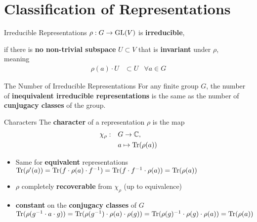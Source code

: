 
\section{Classification of Representations}

\begin{frame}{Irreducible Representations}
    \large
    $\rho: G \to \operatorname{GL}(V)$ is \textbf{irreducible},
    
    \pause
    if there is \textbf{no non-trivial subspace} $U \subset V$ that is \textbf{invariant} under $\rho$, \\
    meaning
    \begin{align*}
        \rho(a) \cdot U & \subset U & \forall a \in G
    \end{align*}

    \normalsize
    {\hspace*{\fill} \cite{hein2013}}

\end{frame}

\begin{frame}{The Number of Irreducible Representations}
    \large
    For any finite group $G$, the number of \textbf{inequivalent irreducible representations} is the same as the number of \textbf{cunjugacy classes} of the group.

    {\hspace*{\fill} \cite{fulton2013}}
    
\end{frame}

\begin{frame}{Characters}
    \large
    The \textbf{character} of a representation $\rho$ is the map
    \Large
    \begin{align*}
        \chi_\rho: \quad & G \to \mathbb{C}, \\
        & a \mapsto \operatorname{Tr}(\rho(a))
    \end{align*}
    
    \pause
    \large
    \begin{itemize}
        \item Same for \textbf{equivalent} representations
            \hspace*{\fill} $\operatorname{Tr}(\rho'(a)) = \operatorname{Tr}(f \cdot \rho(a) \cdot f^{-1}) = \operatorname{Tr}(f \cdot f^{-1} \cdot \rho(a)) = \operatorname{Tr}(\rho(a))$ \pause
        \item $\rho$ completely \textbf{recoverable} from $\chi_\rho$ (up to equivalence) \pause
        \item \textbf{constant} on the \textbf{conjugacy classes} of $G$
            \hspace*{\fill} $\operatorname{Tr}(\rho(g^{-1} \cdot a \cdot g)) = \operatorname{Tr}(\rho(g^{-1}) \cdot \rho(a) \cdot \rho(g)) = \operatorname{Tr}(\rho(g)^{-1} \cdot \rho(g) \cdot \rho(a)) = \operatorname{Tr}(\rho(a))$
    \end{itemize}

    \normalsize
    {\hspace*{\fill} \cite{fulton2013}}
    
\end{frame}

